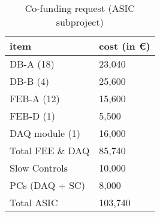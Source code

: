 \begin{table}[htp!]
\caption{Co-funding request (ASIC subproject)}
\begin{center}
\begin{tabular}{|l|l|}
\hline
item & cost (in \euro) \\
\hline
DB-A (18) &	23,040 \\
DB-B (4) &	25,600 \\
FEB-A (12)  & 15,600 \\
FEB-D (1) & 5,500 \\
DAQ module (1) &	16,000 \\
\hline
Total FEE \& DAQ &	85,740 \\
\hline
Slow Controls & 10,000 \\
\hline	
PCs (DAQ + SC) &	8,000 \\
\hline
Total ASIC &	103,740 \\
\hline
\end{tabular}
\end{center}
\label{tab.costs.asic}
\end{table}%
